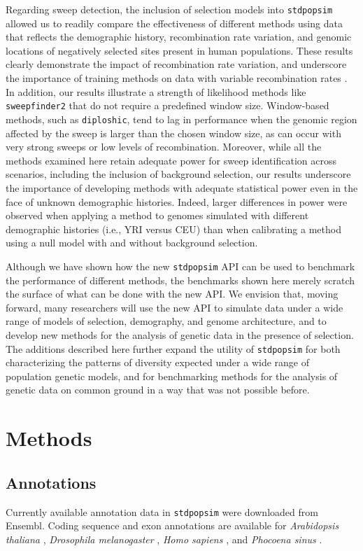 \documentclass[hidelinks]{article}
\newcommand{\stdpopsim}{\texttt{stdpopsim}\xspace}
\newcommand{\sweepfinder}{\texttt{sweepfinder2}\xspace}
\newcommand{\diploshic}{\texttt{diploshic}\xspace}
\begin{document}
    Regarding sweep detection, the inclusion of selection models into \stdpopsim allowed us to readily compare the
    effectiveness of different methods using data that reflects the demographic history, recombination rate variation,
    and genomic locations of negatively selected sites present in human populations. These results clearly demonstrate
    the impact of recombination rate variation, and underscore the importance of training methods on data with variable
    recombination rates \citep[e.g.,][]{schrider2017soft}. In addition, our results
    illustrate a strength of likelihood methods like \sweepfinder that do not require a predefined window size.
    Window-based methods, such as \diploshic, tend to lag in performance when the genomic region affected by the sweep is
    larger than the chosen window size, as can occur with very strong sweeps or low levels of
    recombination. Moreover, while all the methods examined here retain adequate power for sweep identification across
    scenarios, including the inclusion of background selection, our results underscore the importance of developing
    methods with adequate statistical power even in the face of unknown demographic histories. Indeed, larger differences
    in power were observed when applying a method to genomes simulated with different demographic histories (i.e., YRI versus CEU)
    than when calibrating a method using a null model with and without background selection.

    Although we have shown how the new \stdpopsim API can be used to benchmark the performance of different methods,
    the benchmarks shown here merely scratch the surface of what can be done with the new API.
    We envision that, moving forward, many researchers will use
    the new API to simulate data under a wide range of models of selection, demography, and genome architecture, and to develop
    new methods for the analysis of genetic data in the presence of selection.
    The additions described here further expand the utility of \stdpopsim for both
    characterizing the patterns of diversity expected under a wide range of population genetic
    models, and for benchmarking methods for the analysis of genetic data
    on common ground in a way that was not possible before. 

\section*{Methods}
    \label{methods}

    \subsection*{Annotations}
    Currently available annotation data in \stdpopsim were downloaded from Ensembl.
    Coding sequence and exon annotations are available for
    \textit{Arabidopsis thaliana} \citep{cheng2017araport},
    \textit{Drosophila melanogaster} \citep{hoskins2015release},
    \textit{Homo sapiens} \citep{hunt2018ensembl},
    and \textit{Phocoena sinus} \citep[vaquita porpoise,][]{morin2021}.
\end{document}
